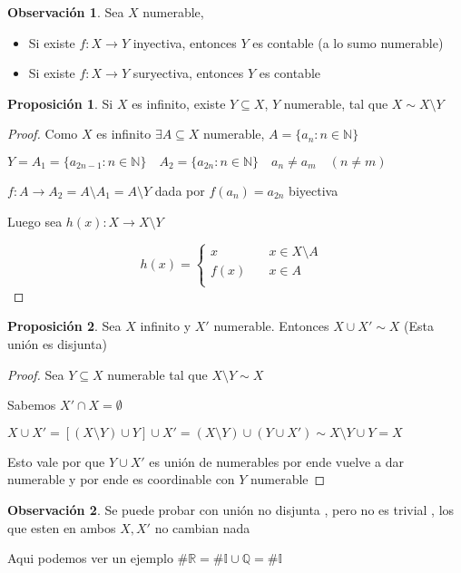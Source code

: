 \documentclass[12pt]{article}
\newcommand{\Q}{\mathbb{Q}}
\newcommand{\R}{\mathbb{R}}
\newcommand{\I}{\mathbb{I}}
\newcommand{\N}{\mathbb{N}}
\newcommand{\ra}{\rightarrow}
\theoremstyle{definition}
\newtheorem*{remark}{Observación}
\newtheorem{prop}{Proposición}
\begin{document}
\begin{remark}
  Sea $X$ numerable,
  \begin{itemize}
    \item Si existe $f:X \ra Y $ inyectiva, entonces $Y$ es contable (a lo sumo numerable)
	\item Si existe $f:X \ra Y$ suryectiva, entonces $Y$ es contable
    \end{itemize}
\end{remark}

\begin{prop}
  Si $X$ es infinito, existe $Y \subseteq X$, $ Y$ numerable, tal que $X \sim X \setminus Y$

  \begin{proof}
  Como $X$ es infinito $\exists A \subseteq X$ numerable, $A = \{a_{n}: n \in \N\}$

  $Y = A_{1} = \{a_{2n -1} : n \in \N \} \quad A_{2} = \{a_{2n} : n \in \N \} \quad a_{n} \neq a_{m} \quad (n \neq m)$ 

  $f : A \ra A_{2} = A \setminus A_{1} = A \setminus Y$ dada por $f(a_{n}) = a_{2n}$ biyectiva 

  Luego sea $h(x): X \ra X \setminus Y$ 

\[
h(x) =
     \begin{cases}
       \text{$x$} &\quad\text{$x \in X \setminus A$ }\\
       \text{$f(x)$} &\quad\text{$x \in A$} \\
     \end{cases}
\]

  \end{proof}
\end{prop}


\begin{prop}
  Sea $X$ infinito y $X'$ numerable. Entonces $X \cup X' \sim X$ (Esta unión es disjunta)

  \begin{proof}
   Sea $Y \subseteq X$ numerable tal que $X \setminus Y \sim X$

  Sabemos $X' \cap X = \emptyset$ 

  $X \cup X' = [(X \setminus Y) \cup Y ] \cup X' = (X \setminus Y) \cup (Y \cup X') \sim X \setminus Y \cup Y = X$

  Esto vale por que $Y \cup X'$ es unión de numerables por ende vuelve a dar numerable y por ende es coordinable con $Y$ numerable
   
   
  \end{proof}

  \begin{remark}
    Se puede probar con unión no disjunta , pero no es trivial , los que esten en ambos $X, X'$ no cambian nada
  
    Aqui podemos ver un ejemplo $\# \R = \# \I \cup \Q = \# \I$

  \end{remark}
\end{prop}
\end{document}
